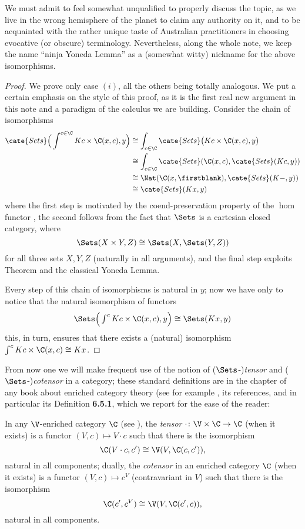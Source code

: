 We must admit to feel somewhat unqualified to properly discuss the topic, as we live in the wrong hemisphere of the planet to claim any authority on it, and to be acquainted with the rather unique taste of Australian practitioners in choosing evocative (or obscure) terminology. Nevertheless, along the whole note, we keep the name ``ninja Yoneda Lemma'' as a (somewhat witty) nickname for the above isomorphisms.
\begin{proof}
We prove only case $(i)$, all the others being totally analogous. We put a certain emphasis on the style of this proof, as it is the first real new argument in this note and a paradigm of the calculus we are building. Consider the chain of isomorphisms
\begin{align*}
\cate{Sets}\Big(\displaystyle \int^{c\in\C} Kc\times \C(x,c),y\Big)&\cong \int_{c\in\C} \cate{Sets}\big( Kc\times \C(x,c),y \big)\\
&\cong \int_{c\in\C}\cate{Sets}(\C(x,c),\cate{Sets}(Kc,y))\\
&\cong \Nat(\C(x,\firstblank),\cate{Sets}(K-,y))\\
&\cong\cate{Sets}(Kx,y)
\end{align*}
where the first step is motivated by the coend-preservation property of the $\hom$ functor , the second follows from the fact that $\Sets$ is a cartesian closed category, where 
\[
\Sets(X\times Y, Z)\cong \Sets(X, \Sets(Y,Z))
\]
for all three sets $X,Y,Z$ (naturally in all arguments), and the final step exploits Theorem  and the classical Yoneda Lemma.

Every step of this chain of isomorphisms is natural in $y$; now we have only to notice that the natural isomorphism of functors
\[
\Sets\Big(\textstyle \int^c Kc\times \C(x,c),y\Big)\cong \Sets(Kx,y)
\]
this, in turn, ensures that there exists a (natural) isomorphism $\int^c Kc\times \C(x,c)\cong Kx$.%
\end{proof}
From now one we will make frequent use of the notion of ($\Sets$-)\emph{tensor} and ($\Sets$-)\emph{cotensor} in a category; these standard definitions are in the chapter of any book about enriched category theory (see for example \cite[Ch. \textbf{6}]{Bor2}, its references, and in particular its Definition \textbf{6.5.1}, which we report for the ease of the reader:
\begin{definition}\label{tenscotens}
In any $\V$-enriched category $\C$ (see \cite[Def\@. \textbf{6.2.1}]{Bor2}), the \emph{tensor} $\cdot\colon \V\times \C\to \C$ (when it exists) is a functor $(V, c)\mapsto V\cdot c$ such that there is the isomorphism \[ \label{ten} \C(V\cdot c, c')\cong \V(V, \C(c,c')),\] natural in all components; dually, the \emph{cotensor} in an enriched category $\C$ (when it exists) is a functor $(V, c)\mapsto c^V$ (contravariant in $V$) such that there is the isomorphism \[ \label{coten} \C(c', c^V)\cong \V(V, \C(c',c)),\] natural in all components. 
\end{definition}
